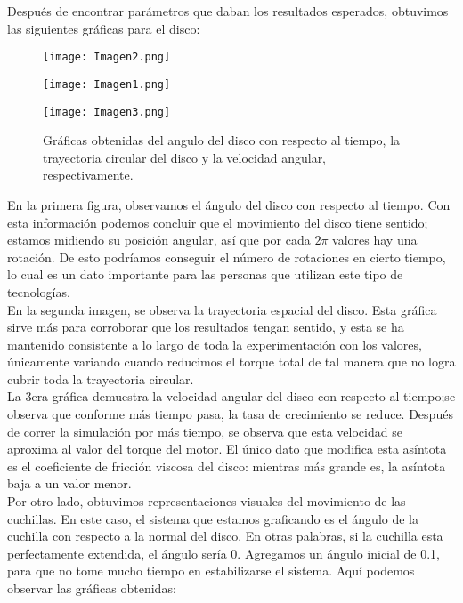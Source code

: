 \documentclass[12pt]{article}
\begin{document}
Después de encontrar parámetros que daban los resultados esperados, obtuvimos las siguientes gráficas para el disco:


\begin{figure}[H]
    \centering
    \begin{minipage}[b]{0.3\textwidth}
    \texttt{[image: Imagen2.png]}
  \end{minipage}
  \hfill
  \begin{minipage}[b]{0.3\textwidth}
    \texttt{[image: Imagen1.png]}
  \end{minipage}
  \hfill
  \begin{minipage}[b]{0.3\textwidth}
    \texttt{[image: Imagen3.png]}
  \end{minipage}
    \caption{Gráficas obtenidas del angulo del disco con respecto al tiempo, la trayectoria circular del disco y la velocidad angular, respectivamente.}
    \label{fig:enter-label}
\end{figure}

 En la primera figura, observamos el ángulo del disco con respecto al tiempo. Con esta información podemos concluir que el movimiento del disco tiene sentido; estamos midiendo su posición angular, así que por cada $2\pi$ valores hay una rotación. De esto podríamos conseguir el número de rotaciones en cierto tiempo, lo cual es un dato importante para las personas que utilizan este tipo de tecnologías. \\

 
En la segunda imagen, se observa la trayectoria espacial del disco. Esta gráfica sirve más para corroborar que los resultados tengan sentido, y esta se ha mantenido consistente a lo largo de toda la experimentación con los valores, únicamente variando cuando reducimos el torque total de tal manera que no logra cubrir toda la trayectoria circular.\\

La 3era gráfica demuestra la velocidad angular del disco con respecto al tiempo;se observa que conforme más tiempo pasa, la tasa de crecimiento se reduce. Después de correr la simulación por más tiempo, se observa que esta velocidad se aproxima al valor del torque del motor. El único dato que modifica esta asíntota es el coeficiente de fricción viscosa del disco: mientras más grande es, la asíntota baja a un valor menor.\\


	Por otro lado, obtuvimos representaciones visuales del movimiento de las cuchillas. En este caso, el sistema que estamos graficando es el ángulo de la cuchilla con respecto a la normal del disco. En otras palabras, si la cuchilla esta perfectamente extendida, el ángulo sería 0. Agregamos un ángulo inicial de 0.1, para que no tome mucho tiempo en estabilizarse el sistema. Aquí podemos observar las gráficas obtenidas:
\end{document}
